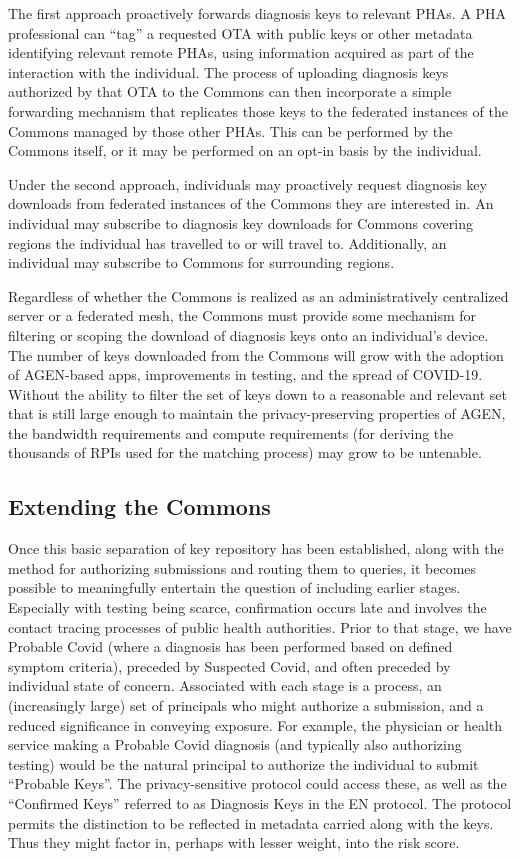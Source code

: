 The first approach proactively forwards diagnosis keys to relevant PHAs.
A PHA professional can ``tag'' a requested OTA with public keys or other metadata identifying relevant remote PHAs, using information acquired as part of the interaction with the individual.
The process of uploading diagnosis keys authorized by that OTA to the Commons can then incorporate a simple forwarding mechanism that replicates those keys to the federated instances of the Commons managed by those other PHAs.
This can be performed by the Commons itself, or it may be performed on an opt-in basis by the individual.

Under the second approach, individuals may proactively request diagnosis key downloads from federated instances of the Commons they are interested in.
An individual may subscribe to diagnosis key downloads for Commons covering regions the individual has travelled to or will travel to.
Additionally, an individual may subscribe to Commons for surrounding regions.

Regardless of whether the Commons is realized as an administratively centralized server or a federated mesh, the Commons must provide some mechanism for filtering or scoping the download of diagnosis keys onto an individual's device.
The number of keys downloaded from the Commons will grow with the adoption of AGEN-based apps, improvements in testing, and the spread of COVID-19.
Without the ability to filter the set of keys down to a reasonable and relevant set that is still large enough to maintain the privacy-preserving properties of AGEN, the bandwidth requirements and compute requirements (for deriving the thousands of RPIs used for the matching process) may grow to be untenable.

\subsection{Extending the Commons}

Once this basic separation of key repository has been established, along with the method for authorizing submissions and routing them to queries, it becomes possible to meaningfully entertain the question of including earlier stages. 
Especially with testing being scarce, confirmation occurs late and involves the contact tracing processes of public health authorities.
Prior to that stage, we have Probable Covid (where a diagnosis has been performed based on defined symptom criteria), preceded by Suspected Covid, and often preceded by individual state of concern. 
Associated with each stage is a process, an (increasingly large) set of principals who might authorize a submission, and a reduced significance in conveying exposure.
For example, the physician or health service making a Probable Covid diagnosis (and typically also authorizing testing) would be the natural principal to authorize the individual to submit “Probable Keys”. 
The privacy-sensitive protocol could access these, as well as the “Confirmed Keys” referred to as Diagnosis Keys in the EN protocol. 
The protocol permits the distinction to be reflected in metadata carried along with the keys. 
Thus they might factor in, perhaps with lesser weight, into the risk score.

